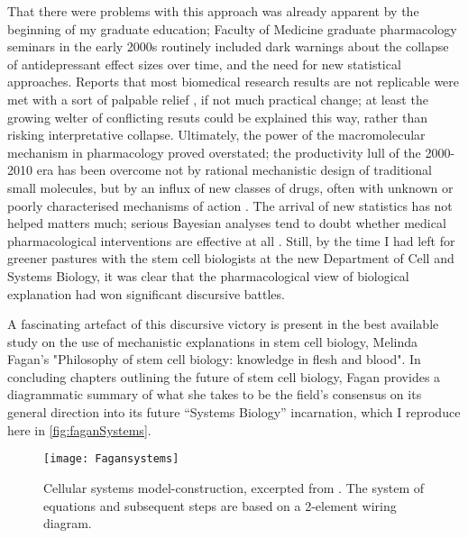 That there were problems with this approach was already apparent by the beginning of my graduate education; Faculty of Medicine graduate pharmacology seminars in the early 2000s routinely included dark warnings about the collapse of antidepressant effect sizes over time, and the need for new statistical approaches. Reports that most biomedical research results are not replicable were met with a sort of palpable relief \cite{Ioannidis2005}, if not much practical change; at least the growing welter of conflicting resuts could be explained this way, rather than risking interpretative collapse. Ultimately, the power of the macromolecular mechanism in pharmacology proved overstated; the productivity lull of the 2000-2010 era has been overcome not by rational mechanistic design of traditional small molecules, but by an influx of new classes of drugs, often with unknown or poorly characterised mechanisms of action \cite{Munos2019}. The arrival of new statistics has not helped matters much; serious Bayesian analyses tend to doubt whether medical pharmacological interventions are effective at all \cite{Stegenga2018}. Still, by the time I had left for greener pastures with the stem cell biologists at the new Department of Cell and Systems Biology, it was clear that the pharmacological view of biological explanation had won significant discursive battles.

A fascinating artefact of this discursive victory is present in the best available study on the use of mechanistic explanations in stem cell biology, Melinda Fagan's "Philosophy of stem cell biology: knowledge in flesh and blood". In concluding chapters outlining the future of stem cell biology, Fagan provides a diagrammatic summary of what she takes to be the field's consensus on its general direction into its future ``Systems Biology'' incarnation, which I reproduce here in \autoref{fig:faganSystems}.


\begin{wrapfigure}{l}{0.4\textwidth}
\texttt{[image: Fagansystems]}
\caption{Cellular systems model-construction, excerpted from \cite[p.7]{Fagan2015}. The system of equations and subsequent steps are based on a 2-element wiring diagram.}
\label{fig:faganSystems}
\end{wrapfigure}

